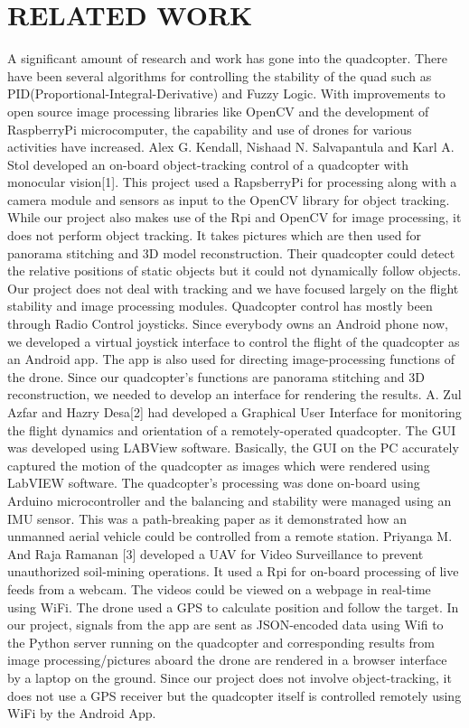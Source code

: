 \chapter{RELATED WORK} %
A significant amount of research and work has gone into the quadcopter. There have been several algorithms for controlling the stability of the quad such as PID(Proportional-Integral-Derivative) and Fuzzy Logic. With improvements to open source image processing libraries like OpenCV and the development of RaspberryPi microcomputer, the capability and use of drones for various activities have increased. Alex G. Kendall, Nishaad N. Salvapantula and Karl A. Stol developed an on-board object-tracking control of a quadcopter with monocular vision[1]. This project used a RapsberryPi for processing along with a camera module and sensors as input to the OpenCV library for object tracking. While our project also makes use of the Rpi and OpenCV for image processing, it does not perform object tracking. It takes pictures which are then used for panorama stitching and 3D model reconstruction. Their quadcopter could detect the relative positions of static objects but it could not dynamically follow objects. Our project does not deal with tracking and we have focused largely on the flight stability and image processing modules.
Quadcopter control has mostly been through Radio Control joysticks. Since everybody owns an Android phone now, we developed a virtual joystick interface to control the flight of the quadcopter as an Android app. The app is also used for directing image-processing functions of the drone. Since our quadcopter's functions are panorama stitching and 3D reconstruction, we needed to develop an interface for rendering the results.  A. Zul Azfar and Hazry Desa[2] had developed a Graphical User Interface for monitoring the flight dynamics and orientation of a remotely-operated quadcopter. The GUI was developed using LABView software. Basically, the GUI on the PC accurately captured the motion of the quadcopter as images which were rendered using LabVIEW software. The quadcopter’s processing was done on-board using Arduino microcontroller and the balancing and stability were managed using an IMU sensor. This was a path-breaking paper as it demonstrated how an unmanned aerial vehicle could be controlled from a remote station. Priyanga M. And Raja Ramanan [3] developed a UAV for Video Surveillance to prevent unauthorized soil-mining operations. It used a Rpi for on-board processing of live feeds from a webcam. The videos could be viewed on a webpage in real-time using WiFi. The drone used a GPS to calculate position and follow the target. In our project, signals from the app are sent as JSON-encoded data using Wifi to the Python server running on the quadcopter and corresponding results from image processing/pictures aboard the drone are rendered in a browser interface by a laptop on the ground. Since our project does not involve object-tracking, it does not use a GPS receiver but the quadcopter itself is controlled remotely using WiFi by the Android App.

